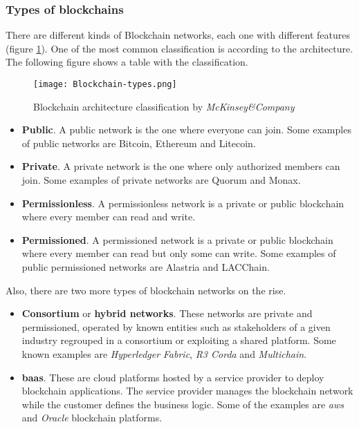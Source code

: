 \subsubsection{Types of blockchains}
There are different kinds of Blockchain networks, each one with different features (figure  \ref{fig:blockchain_classification}). One of the most common classification is according to the architecture. The following figure shows a table with the classification.
\begin{figure}[h]
    \centering
    \texttt{[image: Blockchain-types.png]}
    \caption{Blockchain architecture classification by \textit{McKinsey\&Company}}
    \label{fig:blockchain_classification}
\end{figure}

\begin{itemize}
    \item \textbf{Public}. A public network is the one where everyone can join. Some examples of public networks are Bitcoin, Ethereum and Litecoin.
    \item \textbf{Private}. A private network is the one where only authorized members can join. Some examples of private networks are Quorum and Monax.
    \item \textbf{Permissionless}. A permissionless network is a private or public blockchain where every member can read and write.
    \item \textbf{Permissioned}. A permissioned network is a private or public blockchain where every member can read but only some can write. Some examples of public permissioned networks are Alastria and LACChain.
\end{itemize}
Also, there are two more types of blockchain networks on the rise.
\begin{itemize}
    \item \textbf{Consortium} or \textbf{hybrid networks}. These networks are private and permissioned, operated by known entities such as stakeholders of a given industry regrouped in a consortium or exploiting a shared platform. Some known examples are \textit{Hyperledger} \textit{Fabric}, \textit{R3 Corda} and \textit{Multichain}.
    \item \textbf{\acrfull{baas}}. These are cloud platforms hosted by a service provider to deploy blockchain applications. The service provider manages the blockchain network while the customer defines the business logic. Some of the examples are \textit{\acrfull{aws}} and \textit{Oracle} blockchain platforms.
\end{itemize}


